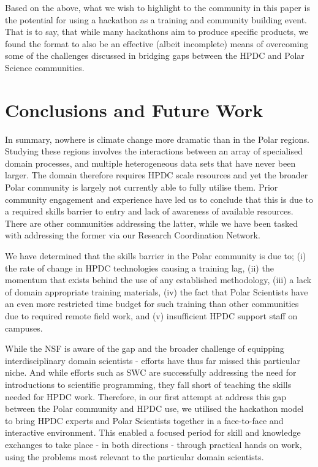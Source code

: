 \documentclass[conference]{IEEEtran}
\begin{document}
Based on the above, what we wish to highlight to the community in this paper is the potential for using a hackathon as a training and community building event.  That is to say, that while many hackathons aim to produce specific products, we found the format to also be an effective (albeit incomplete) means of overcoming some of the challenges discussed in bridging gaps between the HPDC and Polar Science communities.

\section{Conclusions and Future Work}
In summary, nowhere is climate change more dramatic than in the Polar regions.  Studying these regions involves the interactions between an array of specialised domain processes, and multiple heterogeneous data sets that have never been larger.  The domain therefore requires HPDC scale resources and yet the broader Polar community is largely not currently able to fully utilise them.  Prior community engagement and experience have led us to conclude that this is due to a required skills barrier to entry and lack of awareness of available resources.  There are other communities addressing the latter, while we have been tasked with addressing the former via our Research Coordination Network.

We have determined that the skills barrier in the Polar community is due to; (i) the rate of change in HPDC technologies causing a training lag, (ii) the momentum that exists behind the use of any established methodology, (iii) a lack of domain appropriate training materials, (iv) the fact that Polar Scientists have an even more restricted time budget for such training than other communities due to required remote field work, and (v) insufficient HPDC support staff on campuses.

While the NSF is aware of the gap and the broader challenge of equipping interdisciplinary domain scientists - efforts have thus far missed this particular niche.  And while efforts such as SWC are successfully addressing the need for introductions to scientific programming, they fall short of teaching the skills needed for HPDC work.  Therefore, in our first attempt at address this gap between the Polar community and HPDC use, we utilised the hackathon model to bring HPDC experts and Polar Scientists together in a face-to-face and interactive environment.  This enabled a focused period for skill and knowledge exchanges to take place - in both directions - through practical hands on work, using the problems most relevant to the particular domain scientists.  
\end{document}
